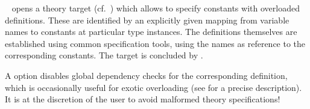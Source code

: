 \begin{isabellebody}
\begin{isamarkuptext}
  \begin{description}

  \item \hyperlink{command.overloading}{\mbox{}}~
  opens a theory target (cf.\ ) which allows to
  specify constants with overloaded definitions.  These are identified
  by an explicitly given mapping from variable names  to
  constants  at particular type instances.  The
  definitions themselves are established using common specification
  tools, using the names  as reference to the
  corresponding constants.  The target is concluded by \hyperlink{command.local.end}{\mbox{}}.

  A  option disables global dependency checks for
  the corresponding definition, which is occasionally useful for
  exotic overloading (see  for a precise description).
  It is at the discretion of the user to avoid
  malformed theory specifications!


\end{description}
\end{isamarkuptext}
\end{isabellebody}
